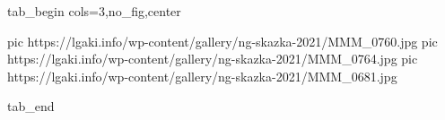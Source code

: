  
 
 
 
 


\ifcmt
  tab_begin cols=3,no_fig,center

     pic https://lgaki.info/wp-content/gallery/ng-skazka-2021/MMM_0760.jpg
		 pic https://lgaki.info/wp-content/gallery/ng-skazka-2021/MMM_0764.jpg
		 pic https://lgaki.info/wp-content/gallery/ng-skazka-2021/MMM_0681.jpg

  tab_end
\fi
